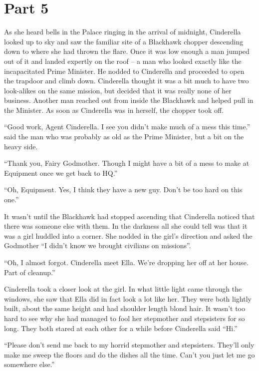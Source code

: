 \documentclass[11pt,letterpaper]{article}
\begin{document}
\section*{Part 5}

As she heard bells in the Palace ringing in the arrival of midnight, Cinderella looked up to sky and saw the familiar site of a Blackhawk chopper descending down to where she had thrown the flare. Once it was low enough a man jumped out of it and landed expertly on the roof -- a man who looked exactly like the incapacitated Prime Minister. He nodded to Cinderella and proceeded to open the trapdoor and climb down. Cinderella thought it was a bit much to have two look-alikes on the same mission, but decided that it was really none of her business. Another man reached out from inside the Blackhawk and helped pull in the Minister. As soon as Cinderella was in herself, the chopper took off.

``Good work, Agent Cinderella. I see you didn't make much of a mess this time.'' said the man who was probably as old as the Prime Minister, but a bit on the heavy side.

``Thank you, Fairy Godmother. Though I might have a bit of a mess to make at Equipment once we get back to HQ.''

``Oh, Equipment. Yes, I think they have a new guy. Don't be too hard on this one.''

It wasn't until the Blackhawk had stopped ascending that Cinderella noticed that there was someone else with them. In the darkness all she could tell was that it was a girl huddled into a corner. She nodded in the girl's direction and asked the Godmother ``I didn't know we brought civilians on missions''.

``Oh, I almost forgot. Cinderella meet Ella. We're dropping her off at her house. Part of cleanup.''

Cinderella took a closer look at the girl. In what little light came through the windows, she saw that Ella did in fact look a lot like her. They were both lightly built, about the same height and had shoulder length blond hair. It wasn't too hard to see why she had managed to fool her stepmother and stepsisters for so long. They both stared at each other for a while before Cinderella said ``Hi.''

``Please don't send me back to my horrid stepmother and stepsisters. They'll only make me sweep the floors and do the dishes all the time. Can't you just let me go somewhere else.''
\end{document}
